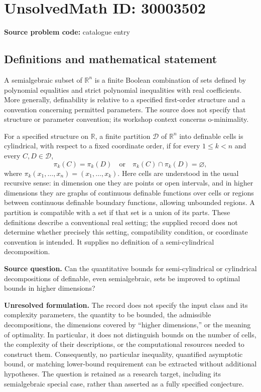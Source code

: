 \documentclass[11pt]{article}
\newcommand{\R}{\mathbb{R}}
\begin{document}
\section*{UnsolvedMath ID: 30003502}
\textbf{Source problem code:} catalogue entry
\subsection{Definitions and mathematical statement}
A semialgebraic subset of \(\R^n\) is a finite Boolean combination of sets defined by polynomial equalities and strict polynomial inequalities with real coefficients. More generally, definability is relative to a specified first-order structure and a convention concerning permitted parameters. The source does not specify that structure or parameter convention; its workshop context concerns o-minimality.

For a specified structure on \(\R\), a finite partition \(\mathcal D\) of \(\R^n\) into definable cells is cylindrical, with respect to a fixed coordinate order, if for every \(1\leq k<n\) and every \(C,D\in\mathcal D\),
\[
\pi_k(C)=\pi_k(D)\quad\text{or}\quad \pi_k(C)\cap\pi_k(D)=\varnothing,
\]
where \(\pi_k(x_1,\ldots,x_n)=(x_1,\ldots,x_k)\). Here cells are understood in the usual recursive sense: in dimension one they are points or open intervals, and in higher dimensions they are graphs of continuous definable functions over cells or regions between continuous definable boundary functions, allowing unbounded regions. A partition is compatible with a set if that set is a union of its parts. These definitions describe a conventional real setting; the supplied record does not determine whether precisely this setting, compatibility condition, or coordinate convention is intended. It supplies no definition of a semi-cylindrical decomposition.

\textbf{Source question.} Can the quantitative bounds for semi-cylindrical or cylindrical decompositions of definable, even semialgebraic, sets be improved to optimal bounds in higher dimensions?

\textbf{Unresolved formulation.} The record does not specify the input class and its complexity parameters, the quantity to be bounded, the admissible decompositions, the dimensions covered by ``higher dimensions,'' or the meaning of optimality. In particular, it does not distinguish bounds on the number of cells, the complexity of their descriptions, or the computational resources needed to construct them. Consequently, no particular inequality, quantified asymptotic bound, or matching lower-bound requirement can be extracted without additional hypotheses. The question is retained as a research target, including its semialgebraic special case, rather than asserted as a fully specified conjecture.
\end{document}
